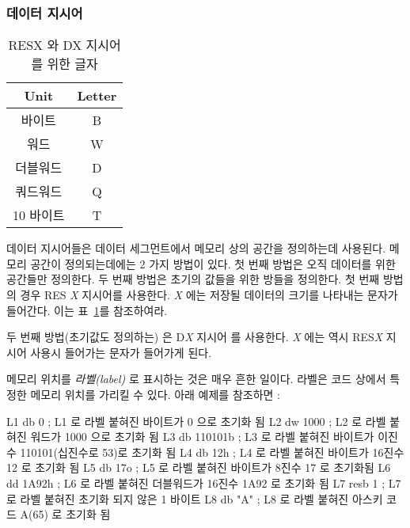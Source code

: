 \subsubsection{데이터 지시어}

\begin{table}[t]
\centering
\begin{tabular}{||c|c||} \hline
{\bf Unit} & {\bf Letter} \\
\hline
바이트 & B \\
워드& W \\
더블워드 & D \\
쿼드워드 & Q \\
10 바이트 & T \\
\hline
\end{tabular}
\caption{{\code RESX} 와 {\code DX} 지시어를 위한 글자 
         \label{tab:size-letters} }
\end{table}

데이터 지시어들은 데이터 세그먼트에서 메모리 상의 공간을 정의하는데 사용된다. 메모리 공간이 정의되는데에는 2 가지 방법이 있다. 첫 번째 방법은
오직 데이터를 위한 공간들만 정의한다. 두 번째 방법은 초기의 값들을 위한 방들을 정의한다. 첫 번째 방법의 경우 {\code RES{\em
X}} 지시어를 사용한다. {\em X} 에는 저장될 데이터의 크기를 나타내는 문자가 들어간다. 이는 표~\ref{tab:size-letters}를
참조하여라. 

두 번째 방법(초기값도 정의하는) 은 {\code D{\em X}} 지시어 를 사용한다. {\em X} 에는 역시 {\code RES{\em X}} 지시어
사용시 들어가는 문자가 들어가게 된다. 

메모리 위치를 \emph{라벨(label)} 로 표시하는 것은 매우 흔한 일이다.  라벨은 코드 상에서 특정한 메모리 위치를 가리킬 수 있다. 아래 
예제를 참조하면 :

\begin{AsmCodeListing}[frame=none, numbers=none]
L1    db     0        ; L1 로 라벨 붙혀진 바이트가 0 으로 초기화 됨
L2    dw     1000     ; L2 로 라벨 붙혀진 워드가 1000 으로 초기화 됨
L3    db     110101b  ; L3 로 라벨 붙혀진 바이트가 이진수 110101(십진수로 53)로 초기화 됨
L4    db     12h      ; L4 로 라벨 붙혀진 바이트가 16진수 12 로 초기화 됨
L5    db     17o      ; L5 로 라벨 붙혀진 바이트가 8진수 17 로 초기화됨
L6    dd     1A92h    ; L6 로 라벨 붙혀진 더블워드가 16진수 1A92 로 초기화 됨
L7    resb   1        ; L7 로 라벨 붙혀진 초기화 되지 않은 1 바이트
L8    db     "A"      ; L8 로 라벨 붙혀진 아스키 코드 A(65) 로 초기화 됨
\end{AsmCodeListing}

